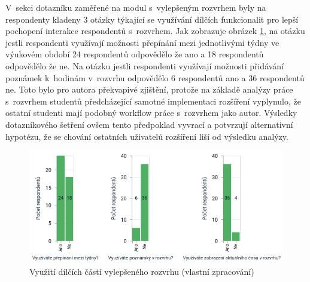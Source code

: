 V~sekci dotazníku zaměřené na modul s~vylepšeným rozvrhem byly na respondenty kladeny 3 otázky týkající se využívání dílčích funkcionalit pro lepší pochopení interakce respondentů s~rozvrhem. Jak zobrazuje obrázek \ref{fig:timetable-feedback}, na otázku jestli respondenti využívají možnosti přepínání mezi jednotlivými týdny ve výukovém období 24 respondentů odpovědělo že ano a 18 respondentů odpovědělo že ne. Na otázku jestli respondenti využívají možnosti přidávání poznámek k~hodinám v~rozvrhu odpovědělo 6 respondentů ano a 36 respondentů ne. Toto bylo pro autora překvapivé zjištění, protože na základě analýzy práce s~rozvrhem studentů předcházející samotné implementaci rozšíření vyplynulo, že ostatní studenti mají podobný workflow práce s~rozvrhem jako autor. Výsledky dotazníkového šetření ovšem tento předpoklad vyvrací a potvrzují alternativní hypotézu, že se chování ostatních uživatelů rozšíření liší od výsledku analýzy.

\begin{figure}[htbp!]\centering
    \includegraphics[width=\textwidth]{img/timetable.png}
    \caption{Využití dílčích částí vylepšeného rozvrhu (vlastní zpracování)}
    \label{fig:timetable-feedback}
\end{figure}
